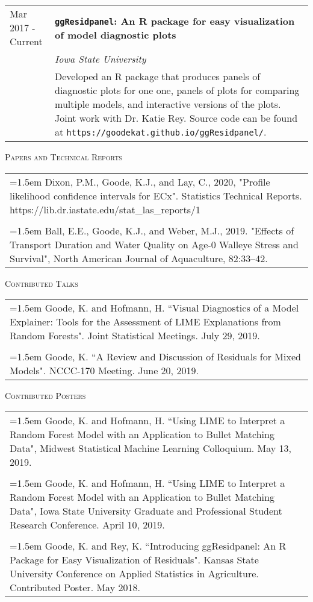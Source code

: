\documentclass[10pt, oneside]{article}
\begin{document}
\begin{longtable}{p{3.5cm}p{13cm}}
\hfill{Mar 2017 - Current} & \textbf{\texttt{ggResidpanel}: An R package for easy visualization of model diagnostic plots}\\
& \emph{Iowa State University}\\
& Developed an R package that produces panels of diagnostic plots for one one, panels of plots for comparing multiple models, and interactive versions of the plots. Joint work with Dr. Katie Rey. Source code can be found at \texttt{https://goodekat.github.io/ggResidpanel/}.
\end{longtable}

\noindent \textsc{Papers and Technical Reports} \hrulefill
\begin{longtable}{p{16.5cm}}
\hangindent=1.5em Dixon, P.M., Goode, K.J., and Lay, C., 2020, "Profile likelihood confidence intervals for ECx". Statistics Technical Reports. https://lib.dr.iastate.edu/stat\_las\_reports/1\\
\\
\hangindent=1.5em Ball, E.E., Goode, K.J., and Weber, M.J., 2019. "Effects of Transport Duration and Water Quality on Age-0 Walleye Stress and Survival", North American Journal of Aquaculture, 82:33–42.
\end{longtable}

\noindent \textsc{Contributed Talks} \hrulefill
\begin{longtable}{p{16.5cm}}
\hangindent=1.5em Goode, K. and Hofmann, H. ``Visual Diagnostics of a Model Explainer: Tools for the Assessment of LIME Explanations from Random Forests". Joint Statistical Meetings. July 29, 2019.\\
\\
\hangindent=1.5em Goode, K. ``A Review and Discussion of Residuals for Mixed Models". NCCC-170 Meeting. June 20, 2019.
\end{longtable}

\noindent \textsc{Contributed Posters} \hrulefill
\begin{longtable}{p{16.5cm}}
\hangindent=1.5em Goode, K. and Hofmann, H. ``Using LIME to Interpret a Random Forest Model with an Application to Bullet Matching Data", Midwest Statistical Machine Learning Colloquium. May 13, 2019.\\
\\ 
\hangindent=1.5em Goode, K. and Hofmann, H. ``Using LIME to Interpret a Random Forest Model with an Application to Bullet Matching Data", Iowa State University Graduate and Professional Student Research Conference. April 10, 2019.\\
\\ 
\hangindent=1.5em Goode, K. and Rey, K. ``Introducing ggResidpanel: An R Package for Easy Visualization of Residuals". Kansas State University Conference on Applied Statistics in Agriculture. Contributed Poster. May 2018.
\end{longtable}
\end{document}
